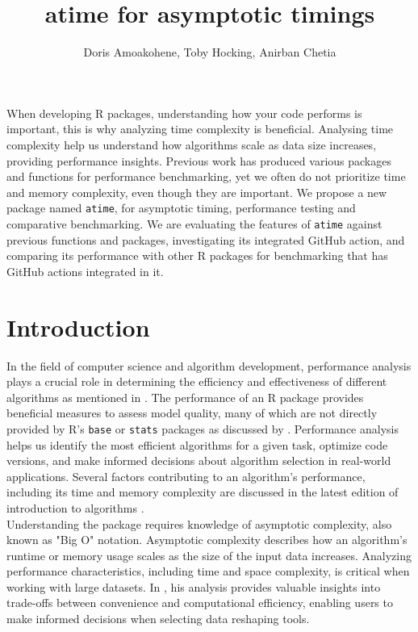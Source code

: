 \title{atime for asymptotic timings }
\author{Doris Amoakohene, Toby Hocking, Anirban Chetia}

\maketitle

\abstract{}
When developing R packages, understanding how your code performs is important, this is why analyzing time complexity is beneficial. Analysing time complexity help us understand how algorithms scale as data size increases, providing performance insights. Previous work has produced various packages and functions for performance benchmarking, yet we often do not prioritize time and memory complexity, even though they are important.
We propose a new package named \texttt{atime}, for asymptotic timing, performance testing and comparative benchmarking. We are evaluating the features of \texttt{atime} against previous functions and packages, investigating its integrated GitHub action, and comparing its performance with other R packages for benchmarking that has GitHub actions integrated in it. 

\section{Introduction}
 In the field of computer science and algorithm development, performance analysis plays a crucial role in determining the efficiency and effectiveness of different algorithms as mentioned in \cite{knuth1997art}. The performance of an R package provides beneficial measures to assess model quality, many of which are not directly provided by R's \texttt{base} or \texttt{stats} packages as discussed by \cite{RcoreTeam}. Performance analysis helps us identify the most efficient algorithms for a given task, optimize code versions, and make informed decisions about algorithm selection in real-world applications. Several factors contributing to an algorithm's performance, including its time and memory complexity are discussed in the latest edition of introduction to algorithms \cite{cormen2022introduction}.\\

\noindent Understanding the  package requires knowledge of asymptotic complexity, also known as "Big O" notation. Asymptotic complexity describes how an algorithm's runtime or memory usage scales as the size of the input data increases. Analyzing performance characteristics, including time and space complexity, is critical when working with large datasets. In \cite{Hocking2021}, his analysis provides valuable insights into trade-offs between convenience and computational efficiency, enabling users to make informed decisions when selecting data reshaping tools.
 
